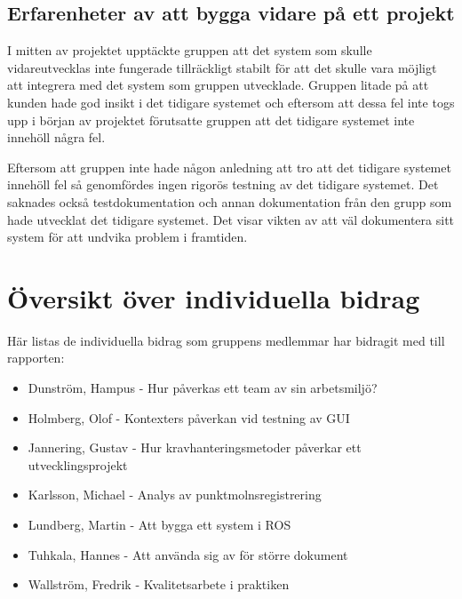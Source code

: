 \subsection{Erfarenheter av att bygga vidare på ett projekt}

I mitten av projektet upptäckte gruppen att det system som skulle vidareutvecklas inte fungerade tillräckligt stabilt för att det skulle vara möjligt att integrera med det system som gruppen utvecklade. Gruppen litade på att kunden hade god insikt i det tidigare systemet och eftersom att dessa fel inte togs upp i början av projektet förutsatte gruppen att det tidigare systemet inte innehöll några fel.

Eftersom att gruppen inte hade någon anledning att tro att det tidigare systemet innehöll fel så genomfördes ingen rigorös testning av det tidigare systemet. Det saknades också testdokumentation och  annan dokumentation från den grupp som hade utvecklat det tidigare systemet. Det visar vikten av att väl dokumentera sitt system för att undvika problem i framtiden.


\section{Översikt över individuella bidrag}

Här listas de individuella bidrag som gruppens medlemmar har bidragit med till rapporten:

\begin{itemize}
	\item Dunström, Hampus - Hur påverkas ett team av sin arbetsmiljö?
	\item Holmberg, Olof - Kontexters påverkan vid testning av GUI
	\item Jannering, Gustav - Hur kravhanteringsmetoder påverkar ett utvecklingsprojekt
	\item Karlsson, Michael - Analys av punktmolnsregistrering
	\item Lundberg, Martin - Att bygga ett system i ROS
	\item Tuhkala, Hannes - Att använda sig av \latex för större dokument
	\item Wallström, Fredrik - Kvalitetsarbete i praktiken
\end{itemize}


